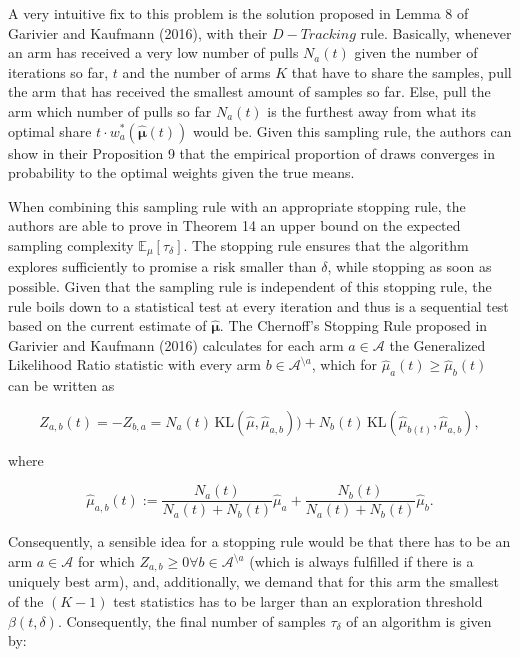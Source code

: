 \documentclass[12pt,]{article}
\newcommand{\KL}{\,\text{KL}}
\begin{document}
A very intuitive fix to this problem is the solution proposed in Lemma 8
of Garivier and Kaufmann (2016), with their \(D-Tracking\) rule.
Basically, whenever an arm has received a very low number of pulls
\(N_a(t)\) given the number of iterations so far, \(t\) and the number
of arms \(K\) that have to share the samples, pull the arm that has
received the smallest amount of samples so far. Else, pull the arm which
number of pulls so far \(N_a(t)\) is the furthest away from what its
optimal share \(t\cdot w^*_a(\hat{\bm{\mu}}(t))\) would be. Given this
sampling rule, the authors can show in their Proposition 9 that the
empirical proportion of draws converges in probability to the optimal
weights given the true means.

When combining this sampling rule with an appropriate stopping rule, the
authors are able to prove in Theorem 14 an upper bound on the expected
sampling complexity \(\mathbb{E}_{\mu}[\tau_{\delta}]\). The stopping
rule ensures that the algorithm explores sufficiently to promise a risk
smaller than \(\delta\), while stopping as soon as possible. Given that
the sampling rule is independent of this stopping rule, the rule boils
down to a statistical test at every iteration and thus is a sequential
test based on the current estimate of \(\hat{\bm{\mu}}\). The Chernoff's
Stopping Rule proposed in Garivier and Kaufmann (2016) calculates for
each arm \(a\in \mathcal{A}\) the Generalized Likelihood Ratio statistic
with every arm \(b \in \mathcal{A}^{\setminus a}\), which for
\(\hat{\mu}_a(t) \geq \hat{\mu}_b(t)\) can be written as

\begin{equation*}
Z_{a,b}(t) = - Z_{b,a} = N_a(t) \KL(\hat{\mu},\hat{\mu}_{a,b})) + N_b(t) \KL(\hat{\mu}_{b(t)}, \hat{\mu}_{a,b}),
\end{equation*}

where

\begin{equation*}
\hat{\mu}_{a,b}(t) := \frac{N_a(t)}{N_a(t) + N_b(t)}\hat{\mu}_a + \frac{N_b(t)}{N_a(t) + N_b(t)}\hat{\mu}_b.
\end{equation*}

Consequently, a sensible idea for a stopping rule would be that there
has to be an arm \(a \in \mathcal{A}\) for which
\(Z_{a,b} \geq 0 \forall b \in \mathcal{A}^{\setminus a}\) (which is
always fulfilled if there is a uniquely best arm), and, additionally, we
demand that for this arm the smallest of the \((K-1)\) test statistics
has to be larger than an exploration threshold \(\beta(t, \delta)\).
Consequently, the final number of samples \(\tau_{\delta}\) of an
algorithm is given by:
\end{document}
